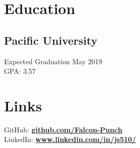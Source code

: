 \documentclass[letterpaper]{deedy-resume} %
\begin{document}



\begin{minipage}[t]{0.33\textwidth} %


\section{Education} 

\subsection{Pacific University}

Expected Graduation May 2019\\
GPA: 3.57

\sectionspace %




\section{Links} 

GitHub: \href{https://github.com/Falcon-Punch}{\bf github.com/Falcon-Punch} \\
LinkedIn: \href{https://www.linkedin.com/in/js510/}{\bf www.linkedin.com/in/js510/}


\end{minipage}
\end{document}
